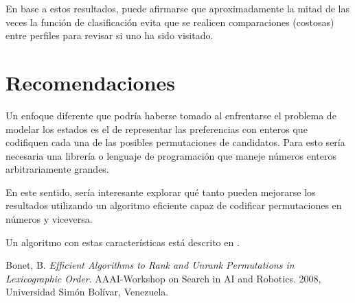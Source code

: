 \documentclass[letterpaper,12pt, titlepage]{article}
\begin{document}
\setcounter{section}{5}
\setcounter{page}{7}

En base a estos resultados, puede afirmarse que aproximadamente la mitad
de las veces la función de clasificación evita que se realicen comparaciones
(costosas) entre perfiles para revisar si uno ha sido visitado.

\section{Recomendaciones}
Un enfoque diferente que podría haberse tomado al enfrentarse el problema
de modelar los estados es el de representar las preferencias con
enteros que codifiquen cada una de las posibles permutaciones de candidatos.
Para esto sería necesaria una librería o lenguaje de programación
que maneje números enteros arbitrariamente grandes.

En este sentido, sería interesante explorar qué
tanto pueden mejorarse los resultados utilizando un algoritmo eficiente capaz de codificar permutaciones
en números y viceversa.

Un algoritmo con estas características está descrito en \cite{1}.

\begin{thebibliography}{9}

    Bonet, B.
    \emph{Efficient Algorithms to Rank and Unrank Permutations in Lexicographic Order}.
    AAAI-Workshop on Search in AI and Robotics.
    2008, Universidad Simón Bolívar, Venezuela.
\end{thebibliography}
\end{document}
